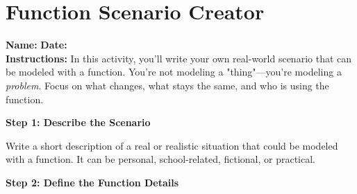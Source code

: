 \documentclass[12pt]{article}
\begin{document}
\section*{Function Scenario Creator}

\textbf{Name:} \underline{\hspace{2.5in}} \hfill \textbf{Date:} \underline{\hspace{1in}} \\[1em]

\textbf{Instructions:} In this activity, you'll write your own real-world scenario that can be modeled with a function. You're not modeling a "thing"—you're modeling a \textit{problem}. Focus on what changes, what stays the same, and who is using the function.

\vspace{1em}

\textbf{Step 1: Describe the Scenario}

Write a short description of a real or realistic situation that could be modeled with a function. It can be personal, school-related, fictional, or practical.

\vspace{2em}

\vspace{2em}

\textbf{Step 2: Define the Function Details}
\end{document}
